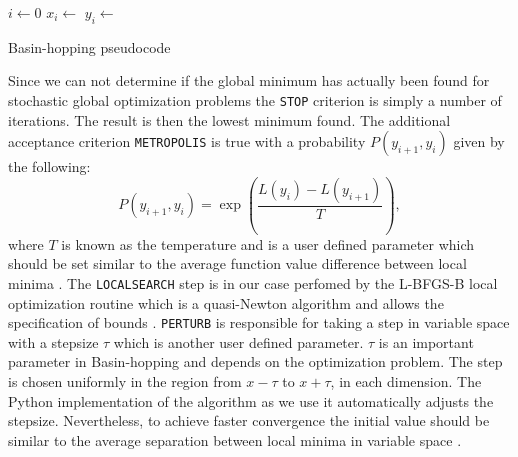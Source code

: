 \begin{algorithm}[H]
    \SetAlgoLined
     
    
    $i \leftarrow 0$\;
    $x_i \leftarrow $ \RP\;
    $y_i \leftarrow $ \;


\caption{Basin-hopping pseudocode}\label{algo_bh}
\end{algorithm}

Since we can not determine if the global minimum has actually been found for stochastic global optimization problems the \texttt{STOP} criterion is simply a number of iterations. The result is then the lowest minimum found. The additional acceptance criterion \texttt{METROPOLIS} is true with a probability $P(y_{i+1}, y_i)$ given by the following:
\begin{equation}
    P(y_{i+1}, y_i) = \exp\left(\frac{L(y_{i})-L(y_{i+1})}{T} \right),
\end{equation}
where $T$ is known as the temperature and is a user defined parameter which should be set similar to the average function value difference between local minima \cite{2020SciPy-NMeth}. The \texttt{LOCALSEARCH} step is in our case perfomed by the L-BFGS-B local optimization routine which is a quasi-Newton algorithm and allows the specification of bounds \cite{Byrd1995}. \texttt{PERTURB} is responsible for taking a step in variable space with a stepsize $\tau$ which is another user defined parameter. $\tau$ is an important parameter in Basin-hopping and depends on the optimization problem. The step is chosen uniformly in the region from $x-\tau$ to $x+\tau$, in each dimension. The Python implementation of the algorithm as we use it automatically adjusts the stepsize. Nevertheless, to achieve faster convergence the initial value should be similar to the average separation between local minima in variable space \cite{ScipyBH}. 


